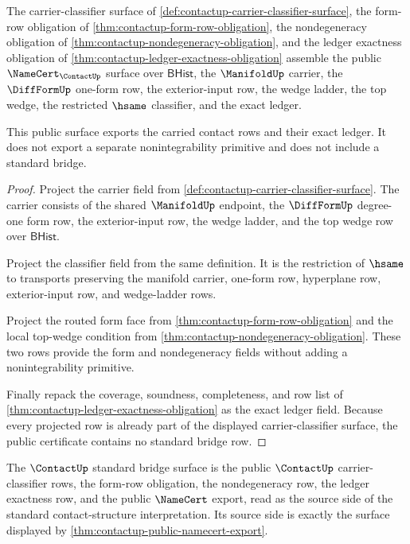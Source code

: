 \begin{theorem}
\label{thm:contactup-public-namecert-export}
The carrier-classifier surface of
\autoref{def:contactup-carrier-classifier-surface}, the form-row obligation of
\autoref{thm:contactup-form-row-obligation}, the nondegeneracy obligation of
\autoref{thm:contactup-nondegeneracy-obligation}, and the ledger exactness
obligation of \autoref{thm:contactup-ledger-exactness-obligation} assemble the
public $\NameCert_{\ContactUp}$ surface over $\mathsf{BHist}$, the
$\ManifoldUp$ carrier, the $\DiffFormUp$ one-form row, the exterior-input row,
the wedge ladder, the top wedge, the restricted $\hsame$ classifier, and the
exact ledger.

This public surface exports the carried contact rows and their exact ledger. It
does not export a separate nonintegrability primitive and does not include a
standard bridge.
\end{theorem}
\begin{proof}
Project the carrier field from
\autoref{def:contactup-carrier-classifier-surface}. The carrier consists of
the shared $\ManifoldUp$ endpoint, the $\DiffFormUp$ degree-one form row, the
exterior-input row, the wedge ladder, and the top wedge row over
$\mathsf{BHist}$.

Project the classifier field from the same definition. It is the restriction
of $\hsame$ to transports preserving the manifold carrier, one-form row,
hyperplane row, exterior-input row, and wedge-ladder rows.

Project the routed form face from
\autoref{thm:contactup-form-row-obligation} and the local top-wedge condition
from \autoref{thm:contactup-nondegeneracy-obligation}. These two rows provide
the form and nondegeneracy fields without adding a nonintegrability primitive.

Finally repack the coverage, soundness, completeness, and row list of
\autoref{thm:contactup-ledger-exactness-obligation} as the exact ledger field.
Because every projected row is already part of the displayed
carrier-classifier surface, the public certificate contains no standard bridge
row.
\end{proof}

\begin{definition}
\label{def:contact-standard-bridge-surface}
The $\ContactUp$ standard bridge surface is the public $\ContactUp$
carrier-classifier rows, the form-row obligation, the nondegeneracy row, the
ledger exactness row, and the public $\NameCert$ export, read as the source
side of the standard contact-structure interpretation. Its source side is
exactly the surface displayed by
\autoref{thm:contactup-public-namecert-export}.
\end{definition}

